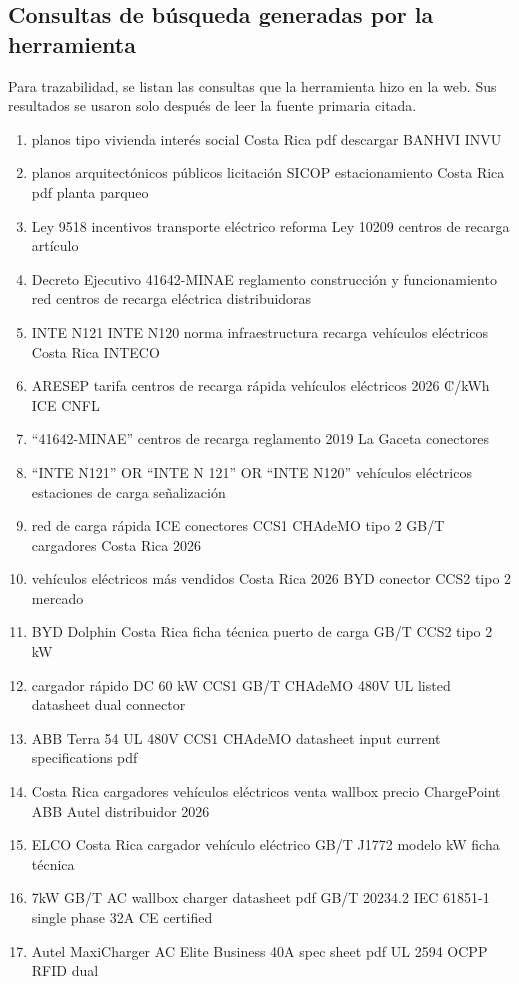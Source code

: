 \subsection*{Consultas de búsqueda generadas por la herramienta}
Para trazabilidad, se listan las consultas que la herramienta hizo en la web. Sus resultados se usaron solo después de leer la fuente primaria citada.
{\small
\begin{enumerate}
\item planos tipo vivienda interés social Costa Rica pdf descargar BANHVI INVU
\item planos arquitectónicos públicos licitación SICOP estacionamiento Costa Rica pdf planta parqueo
\item Ley 9518 incentivos transporte eléctrico reforma Ley 10209 centros de recarga artículo
\item Decreto Ejecutivo 41642-MINAE reglamento construcción y funcionamiento red centros de recarga eléctrica distribuidoras
\item INTE N121 INTE N120 norma infraestructura recarga vehículos eléctricos Costa Rica INTECO
\item ARESEP tarifa centros de recarga rápida vehículos eléctricos 2026 ₡/kWh ICE CNFL
\item ``41642-MINAE'' centros de recarga reglamento 2019 La Gaceta conectores
\item ``INTE N121'' OR ``INTE N 121'' OR ``INTE N120'' vehículos eléctricos estaciones de carga señalización
\item red de carga rápida ICE conectores CCS1 CHAdeMO tipo 2 GB/T cargadores Costa Rica 2026
\item vehículos eléctricos más vendidos Costa Rica 2026 BYD conector CCS2 tipo 2 mercado
\item BYD Dolphin Costa Rica ficha técnica puerto de carga GB/T CCS2 tipo 2 kW
\item cargador rápido DC 60 kW CCS1 GB/T CHAdeMO 480V UL listed datasheet dual connector
\item ABB Terra 54 UL 480V CCS1 CHAdeMO datasheet input current specifications pdf
\item Costa Rica cargadores vehículos eléctricos venta wallbox precio ChargePoint ABB Autel distribuidor 2026
\item ELCO Costa Rica cargador vehículo eléctrico GB/T J1772 modelo kW ficha técnica
\item 7kW GB/T AC wallbox charger datasheet pdf GB/T 20234.2 IEC 61851-1 single phase 32A CE certified
\item Autel MaxiCharger AC Elite Business 40A spec sheet pdf UL 2594 OCPP RFID dual

\end{enumerate}}
